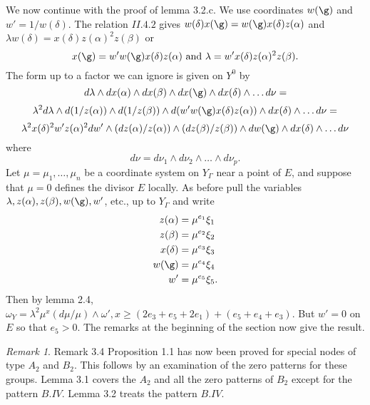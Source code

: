 \documentclass{memo-l}
\theoremstyle{definition}
\theoremstyle{remark}
\newtheorem{remark}[theorem]{Remark}
\numberwithin{section}{chapter}
\numberwithin{equation}{chapter}
\begin{document}
{\medskip}

   We now continue with the proof of lemma 3.2.c.
 We use coordinates $w({\g})$ and $w' = 1/w({\delta})$.
 The relation $II.4.2$ gives $w({\delta})x({\g}) =
w({\g})x({\delta})z({\alpha})$ and ${\lambda}w({\delta}) =
x({\delta})z({\alpha})^{2}z({\beta})$ or
$$
x({\g}) = w'w({\g})x({\delta})z({\alpha})\ {\text{and}}\ {\lambda} =
w'x({\delta})z({\alpha})^{2}z({\beta}).
$$
The form up to a factor we can ignore is given on $Y^{0}$ by
$$
d{\lambda}\wedge dx({\alpha})\wedge dx({\beta})\wedge dx({\g})\wedge
dx({\delta})\wedge \ldots d{\nu} =
$$
$$
{\lambda}^{2}d{\lambda}\wedge d(1/z({\alpha}))\wedge d(1/z({\beta}))\wedge
d(w'w({\g})x({\delta})z({\alpha}))\wedge dx({\delta})\wedge \ldots d{\nu} =
$$
$$
{\lambda}^{2}x({\delta})^{2}w'z({\alpha})^{2}dw'\wedge (dz({\alpha})/z({\alpha}))
\wedge (dz({\beta})/z({\beta}))\wedge dw({\g})\wedge dx({\delta})\wedge
\ldots d{\nu}
$$
where
$$
d{\nu} = d{\nu}_{1}\wedge d{\nu}_{2}\wedge \ldots \wedge d{\nu}_{p}.
$$
Let ${\mu} = {\mu}_{1},\ldots ,{\mu}_{n}$ be a coordinate system on $Y_{{\Gamma}}$
near a point of $E$, and suppose that ${\mu} = 0$ defines the divisor $E$ locally.
 As before pull the variables ${\lambda}, z({\alpha}), z({\beta}),
w({\g}), w'$, etc., up to $Y_{{\Gamma}}$ and write
$$
\aligned
z({\alpha}) &= {\mu}^{e_1} {\xi}_{1} \\
z({\beta})  &= {\mu}^{e_2} {\xi}_{2} \\
x({\delta}) &= {\mu}^{e_3} {\xi}_{3} \\
w({\g}) &= {\mu}^{e_4} {\xi}_{4} \\
w' &= {\mu}^{e_5} {\xi}_5 .
\endaligned
$$
Then by lemma 2.4, ${\omega}_{Y} = {\lambda}^{2}{\mu}^{x}(d{\mu}/{\mu})
\wedge {\omega}', x \ge (2e_{3}+e_{5}+2e_{1}) + (e_{5}+e_{4}+e_{3})$.
 But $w'= 0$ on $E$ so that $e_{5} > 0$.
 The remarks at the beginning of the section now give the result.


\begin{remark}{Remark 3.4}   Proposition 1.1 has now been proved for special nodes
of type $A_{2}$ and $B_{2}$.
 This follows by an examination of the zero patterns for these groups.
 Lemma 3.1 covers the $A_{2}$ and all the zero patterns of $B_{2}$ except
for the pattern $B.IV$.
 Lemma 3.2 treats the pattern $B.IV$.
 \end{remark}
\end{document}
